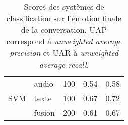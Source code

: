 \begin{table}[]
\begin{tabular}{|c|l|l|l|l|}
\multicolumn{1}{|c|}{\multirow{3}{*}{SVM}} & \multicolumn{1}{l|}{audio}    & \multicolumn{1}{l|}{100}             & \multicolumn{1}{l|}{0.54}          & 0.58          \\ \cline{2-5}
\multicolumn{1}{|c|}{}                     & \multicolumn{1}{l|}{texte}    & \multicolumn{1}{l|}{100}             & \multicolumn{1}{l|}{0.67}          & 0.72          \\ \cline{2-5}
\multicolumn{1}{|c|}{}                     & \multicolumn{1}{l|}{fusion}   & \multicolumn{1}{l|}{200}             & \multicolumn{1}{l|}{0.61}          & 0.67          \\ \hline
\end{tabular}
\caption{Scores des systèmes de classification sur l'émotion finale de la conversation. UAP correspond à \textit{unweighted average precision} et UAR à \textit{unweighted average recall}.}
\label{tab:resultClassifDiscrete}
\end{table}
